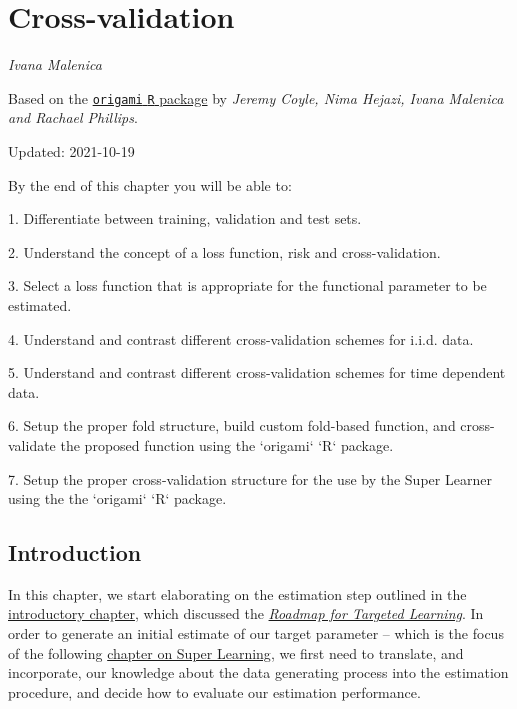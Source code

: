 \documentclass[
  12pt, krantz2,
]{krantz}
\newcommand{\passthrough}[1]{#1}
\theoremstyle{definition}
\theoremstyle{definition}
\theoremstyle{definition}
\newcommand{\1}{\mathbbm{1}}
\begin{document}
\hypertarget{origami}{%
\chapter{Cross-validation}\label{origami}}

\emph{Ivana Malenica}

Based on the \href{https://github.com/tlverse/origami}{\passthrough{\lstinline!origami!} \passthrough{\lstinline!R!} package}
by \emph{Jeremy Coyle, Nima Hejazi, Ivana Malenica and Rachael Phillips}.

Updated: 2021-10-19

\begin{VT1}



By the end of this chapter you will be able to:

1. Differentiate between training, validation and test sets.

2. Understand the concept of a loss function, risk and cross-validation.

3. Select a loss function that is appropriate for the functional parameter to be
   estimated.

4. Understand and contrast different cross-validation schemes for i.i.d. data.

5. Understand and contrast different cross-validation schemes for time dependent
   data.

6. Setup the proper fold structure, build custom fold-based function, and
   cross-validate the proposed function using the `origami` `R` package.

7. Setup the proper cross-validation structure for the use by the Super Learner
   using the the `origami` `R` package.

\end{VT1}

\hypertarget{introduction-1}{%
\section{Introduction}\label{introduction-1}}

In this chapter, we start elaborating on the estimation step outlined in the
\protect\hyperlink{intro}{introductory chapter}, which discussed the \protect\hyperlink{roadmap}{\emph{Roadmap for Targeted
Learning}}. In order to generate an initial estimate of our target
parameter -- which is the focus of the following \protect\hyperlink{sl3}{chapter on Super
Learning}, we first need to translate, and incorporate, our knowledge
about the data generating process into the estimation procedure, and decide how
to evaluate our estimation performance.
\end{document}
